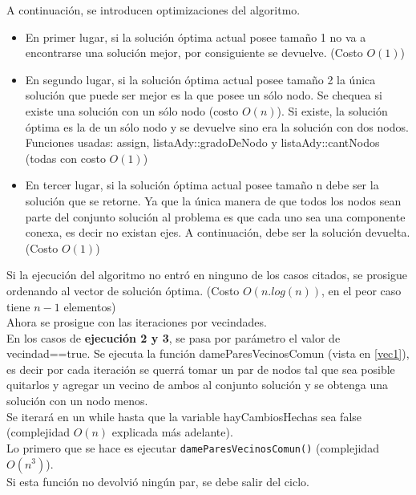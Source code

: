 A continuaci\'on, se introducen optimizaciones del algoritmo.

\begin{itemize}
\item En primer lugar, si la soluci\'on \'optima actual posee tama\~no 1 no va a encontrarse una soluci\'on mejor, por consiguiente se devuelve. (Costo $O(1)$)
\item En segundo lugar, si la soluci\'on \'optima actual posee tama\~no 2 la \'unica soluci\'on que puede ser mejor es la que posee un s\'olo nodo. Se chequea si existe una soluci\'on con un s\'olo nodo (costo $O(n)$). Si existe, la soluci\'on \'optima es la de un s\'olo nodo y se devuelve sino era la soluci\'on con dos nodos. Funciones usadas: assign, listaAdy::gradoDeNodo y listaAdy::cantNodos (todas con costo $O(1)$)
\item En tercer lugar, si la soluci\'on \'optima actual posee tama\~no n debe ser la soluci\'on que se retorne. Ya que la \'unica manera de que todos los nodos sean parte del conjunto soluci\'on al problema es que cada uno sea una componente conexa, es decir no existan ejes. A continuaci\'on, debe ser la soluci\'on devuelta. (Costo $O(1)$)
\end{itemize}

Si la ejecuci\'on del algoritmo no entr\'o en ninguno de los casos citados, se prosigue ordenando al vector de soluci\'on \'optima. (Costo $O(n.log(n))$, en el peor caso tiene $n-1$ elementos)\\

Ahora se prosigue con las iteraciones por vecindades.\\

En los casos de \textbf{ejecuci\'on 2 y 3}, se pasa por par\'ametro el valor de vecindad==true. Se ejecuta la funci\'on dameParesVecinosComun (vista en \ref{vec1}), es decir por cada iteraci\'on se querr\'a tomar un par de nodos tal que sea posible quitarlos y agregar un vecino de ambos al conjunto soluci\'on y se obtenga una soluci\'on con un nodo menos.\\

Se iterar\'a en un while hasta que la variable hayCambiosHechas sea false (complejidad $O(n)$ explicada m\'as adelante).\\

Lo primero que se hace es ejecutar \texttt{dameParesVecinosComun()} (complejidad $O(n^3)$).\\

Si esta funci\'on no devolvi\'o ning\'un par, se debe salir del ciclo.\\

